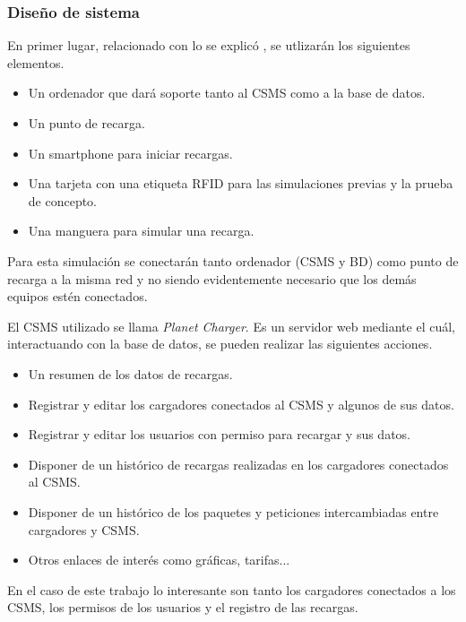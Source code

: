 \documentclass[12pt,a4paper,onecolumn,oneside]{report}
\begin{document}
\subsubsection{Diseño de sistema}

En primer lugar, relacionado con lo se explicó , se utlizarán los siguientes elementos.

\begin{itemize}
\item Un ordenador que dará soporte tanto al CSMS como a la base de datos.
\item Un punto de recarga.
\item Un smartphone para iniciar recargas.
\item Una tarjeta con una etiqueta RFID para las simulaciones previas y la prueba de concepto.
\item Una manguera para simular una recarga.
\end{itemize}

Para esta simulación se conectarán tanto ordenador (CSMS y BD) como punto de recarga a la misma red y no siendo evidentemente necesario que los demás equipos estén conectados.

El CSMS utilizado se llama \textit{Planet Charger}. Es un servidor web mediante el cuál, interactuando con la base de datos, se pueden realizar las siguientes acciones.

\begin{itemize} 
\item Un resumen de los datos de recargas.
\item Registrar y editar los cargadores conectados al CSMS y algunos de sus datos.
\item Registrar y editar los usuarios con permiso para recargar y sus datos.
\item Disponer de un histórico de recargas realizadas en los cargadores conectados al CSMS.
\item Disponer de un histórico de los paquetes y peticiones intercambiadas entre cargadores y CSMS.
\item Otros enlaces de interés como gráficas, tarifas...
\end{itemize}


En el caso de este trabajo lo interesante son tanto los cargadores conectados a los CSMS, los permisos de los usuarios y el registro de las recargas.
\end{document}
